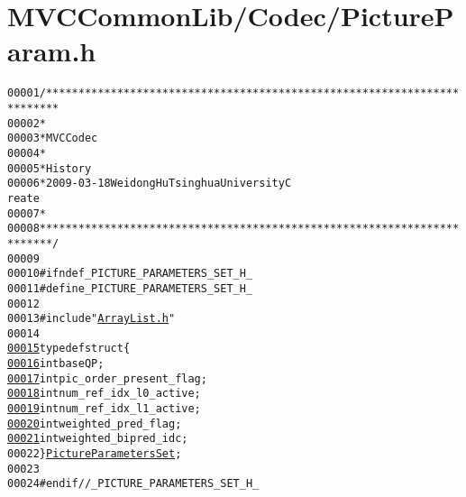 \hypertarget{_picture_param_8h_source}{
\section{MVCCommonLib/Codec/PictureParam.h}
}


\begin{footnotesize}\begin{alltt}
00001 \textcolor{comment}{/************************************************************************}
00002 \textcolor{comment}{ *}
00003 \textcolor{comment}{ * MVC Codec}
00004 \textcolor{comment}{ * }
00005 \textcolor{comment}{ * History}
00006 \textcolor{comment}{ * 2009-03-18           Weidong Hu              Tsinghua University             C
      reate}
00007 \textcolor{comment}{ * }
00008 \textcolor{comment}{ ************************************************************************/}
00009 
00010 \textcolor{preprocessor}{#ifndef \_PICTURE\_PARAMETERS\_SET\_H\_}
00011 \textcolor{preprocessor}{}\textcolor{preprocessor}{#define \_PICTURE\_PARAMETERS\_SET\_H\_}
00012 \textcolor{preprocessor}{}
00013 \textcolor{preprocessor}{#include "\hyperlink{_array_list_8h}{ArrayList.h}"}
00014 
\hypertarget{_picture_param_8h_source_l00015}{}\hyperlink{struct_picture_parameters_set}{00015} \textcolor{keyword}{typedef} \textcolor{keyword}{struct }\{
\hypertarget{_picture_param_8h_source_l00016}{}\hyperlink{struct_picture_parameters_set_a1c6a508d31929ad84dec0b717ac484a4}{00016}         \textcolor{keywordtype}{int} baseQP;
\hypertarget{_picture_param_8h_source_l00017}{}\hyperlink{struct_picture_parameters_set_a9611d788502cf2646a1fafd8f1cc7e4f}{00017}         \textcolor{keywordtype}{int} pic\_order\_present\_flag;
\hypertarget{_picture_param_8h_source_l00018}{}\hyperlink{struct_picture_parameters_set_abc9eb8dcb637bef8a76a7c12380fccf9}{00018}         \textcolor{keywordtype}{int} num\_ref\_idx\_l0\_active;
\hypertarget{_picture_param_8h_source_l00019}{}\hyperlink{struct_picture_parameters_set_afb1dc1e024b6c9263e33d3f1dd233203}{00019}         \textcolor{keywordtype}{int} num\_ref\_idx\_l1\_active;
\hypertarget{_picture_param_8h_source_l00020}{}\hyperlink{struct_picture_parameters_set_a4cd484fee6229fd37fa2bf7519458f3a}{00020}         \textcolor{keywordtype}{int} weighted\_pred\_flag;
\hypertarget{_picture_param_8h_source_l00021}{}\hyperlink{struct_picture_parameters_set_a436591953af7e22c28e0e2844acdf9f3}{00021}         \textcolor{keywordtype}{int} weighted\_bipred\_idc;
00022 \} \hyperlink{struct_picture_parameters_set}{PictureParametersSet};
00023 
00024 \textcolor{preprocessor}{#endif //\_PICTURE\_PARAMETERS\_SET\_H\_}
\end{alltt}\end{footnotesize}
